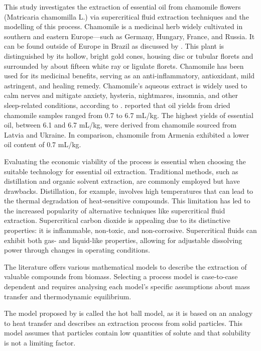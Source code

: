 \documentclass[../Article_Model_Parameters.tex]{subfiles}
\begin{document}
	
	This study investigates the extraction of essential oil from chamomile flowers (Matricaria chamomilla L.) via supercritical fluid extraction techniques and the modelling of this process. Chamomile is a medicinal herb widely cultivated in southern and eastern Europe—such as Germany, Hungary, France, and Russia. It can be found outside of Europe in Brazil as discussed by \citet{Singh2011}. This plant is distinguished by its hollow, bright gold cones, housing disc or tubular florets and surrounded by about fifteen white ray or ligulate florets. Chamomile has been used for its medicinal benefits, serving as an anti-inflammatory, antioxidant, mild astringent, and healing remedy. Chamomile's aqueous extract is widely used to calm nerves and mitigate anxiety, hysteria, nightmares, insomnia, and other sleep-related conditions, according to \citet{Srivastava2009}. \citet{Orav2010} reported that oil yields from dried chamomile samples ranged from 0.7 to 6.7 mL/kg. The highest yields of essential oil, between 6.1 and 6.7 mL/kg, were derived from chamomile sourced from Latvia and Ukraine. In comparison, chamomile from Armenia exhibited a lower oil content of 0.7 mL/kg.
	
	Evaluating the economic viability of the process is essential when choosing the suitable technology for essential oil extraction. Traditional methods, such as distillation and organic solvent extraction, are commonly employed but have drawbacks. Distillation, for example, involves high temperatures that can lead to the thermal degradation of heat-sensitive compounds. This limitation has led to the increased popularity of alternative techniques like supercritical fluid extraction. Supercritical carbon dioxide is appealing due to its distinctive properties: it is inflammable, non-toxic, and non-corrosive. Supercritical fluids can exhibit both gas- and liquid-like properties, allowing for adjustable dissolving power through changes in operating conditions.
	
	The literature offers various mathematical models to describe the extraction of valuable compounds from biomass. Selecting a process model is case-to-case dependent and requires analysing each model's specific assumptions about mass transfer and thermodynamic equilibrium.
	
	The model proposed by \citet{Reverchon1993} is called the hot ball model, as it is based on an analogy to heat transfer and describes an extraction process from solid particles. This model assumes that particles contain low quantities of solute and that solubility is not a limiting factor.
	
\end{document}
